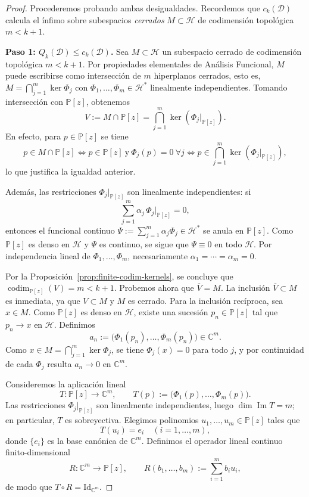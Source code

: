 \documentclass[12pt,a4paper]{article}
\theoremstyle{definition}
\theoremstyle{remark}
\newcommand{\Poly}{\mathbb{P}[z]}
\newcommand{\D}{\mathcal{D}}
\begin{document}
\begin{proof}
  Procederemos probando ambas desigualdades. Recordemos que $c_k(\D)$ calcula el ínfimo sobre subespacios \textit{cerrados} $M \subset \mathcal{H}$ de codimensión topológica $m < k+1$.

  \textbf{Paso 1: $Q_k(\D) \le c_k(\D)$.}
  Sea $M \subset \mathcal{H}$ un subespacio cerrado de codimensión topológica $m < k+1$. Por propiedades elementales de Análisis Funcional, $M$ puede escribirse como intersección de $m$ hiperplanos cerrados, esto es, $M=\bigcap_{j=1}^m\ker\Phi_j$ con $\Phi_1,\dots,\Phi_m\in\mathcal{H}^*$ linealmente independientes. Tomando intersección con $\Poly$, obtenemos
  \[
    V:=M\cap\Poly=\bigcap_{j=1}^m\ker(\Phi_j|_{\Poly}).
  \]
  En efecto, para $p\in\Poly$ se tiene
  \[
    p\in M\cap\Poly
    \iff p\in\Poly\ \text{y}\ \Phi_j(p)=0\ \forall j
    \iff p\in\bigcap_{j=1}^m\ker(\Phi_j|_{\Poly}),
  \]
  lo que justifica la igualdad anterior.

  Además, las restricciones $\Phi_j|_{\Poly}$ son linealmente independientes: si
  \[
    \sum_{j=1}^m \alpha_j\,\Phi_j|_{\Poly}=0,
  \]
  entonces el funcional continuo $\Psi:=\sum_{j=1}^m \alpha_j\Phi_j\in\mathcal{H}^*$ se anula en $\Poly$. Como $\Poly$ es denso en $\mathcal{H}$ y $\Psi$ es continuo, se sigue que $\Psi\equiv 0$ en todo $\mathcal{H}$. Por independencia lineal de $\Phi_1,\dots,\Phi_m$, necesariamente $\alpha_1=\cdots=\alpha_m=0$.

  Por la Proposición~\ref{prop:finite-codim-kernels}, se concluye que $\operatorname{codim}_{\Poly}(V)=m<k+1$.
  Probemos ahora que $\overline V=M$. La inclusión $\overline V\subset M$ es inmediata, ya que $V\subset M$ y $M$ es cerrado. Para la inclusión recíproca, sea $x\in M$. Como $\Poly$ es denso en $\mathcal H$, existe una sucesión $p_n\in \Poly$ tal que $p_n\to x$ en $\mathcal H$. Definimos
  \[
    a_n:=\bigl(\Phi_1(p_n),\dots,\Phi_m(p_n)\bigr)\in\mathbb C^m.
  \]
  Como $x\in M=\bigcap_{j=1}^m\ker\Phi_j$, se tiene $\Phi_j(x)=0$ para todo $j$, y por continuidad de cada $\Phi_j$ resulta $a_n\to 0$ en $\mathbb C^m$.

  Consideremos la aplicación lineal
  \[
    T:\Poly\to\mathbb C^m,\qquad T(p):=\bigl(\Phi_1(p),\dots,\Phi_m(p)\bigr).
  \]
  Las restricciones $\Phi_j|_{\Poly}$ son linealmente independientes, luego $\dim\operatorname{Im}T=m$; en particular, $T$ es sobreyectiva. Elegimos polinomios $u_1,\dots,u_m\in\Poly$ tales que
  \[
    T(u_i)=e_i\quad (i=1,\dots,m),
  \]
  donde $\{e_i\}$ es la base canónica de $\mathbb C^m$. Definimos el operador lineal continuo finito-dimensional
  \[
    R:\mathbb C^m\to\Poly,\qquad R(b_1,\dots,b_m):=\sum_{i=1}^m b_i u_i,
  \]
  de modo que $T\circ R=\mathrm{Id}_{\mathbb C^m}$.


\end{proof}
\end{document}
